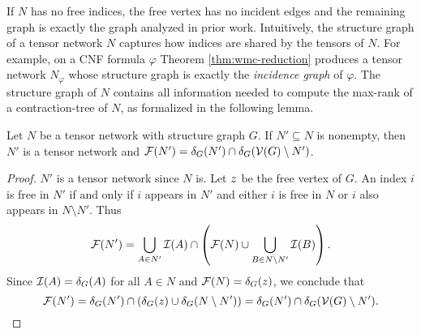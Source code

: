 If $N$ has no free indices, the free vertex has no incident edges and the remaining graph is exactly the graph analyzed in prior work. Intuitively, the structure graph of a tensor network $N$ captures how indices are shared by the tensors of $N$. For example, on a CNF formula $\varphi$ Theorem \ref{thm:wmc-reduction} produces a tensor network $N_\varphi$ whose structure graph is exactly the \emph{incidence graph} of $\varphi$. The structure graph of $N$ contains all information needed to compute the max-rank of a contraction-tree of $N$, as formalized in the following lemma.
\begin{lemma} \label{lemma:tcn-equiv-structure}
	Let $N$ be a tensor network with structure graph $G$. If $N' \subseteq N$ is nonempty, then $N'$ is a tensor network and $\mathcal{F}(N') = \delta_{G}(N') \cap \delta_{G}(\mathcal{V}(G) \setminus N')$.
\end{lemma}
\begin{proof}
	$N'$ is a tensor network since $N$ is. Let $z$ be the free vertex of $G$.
	An index $i$ is free in $N'$ if and only if $i$ appears in $N'$ and either $i$ is free in $N$ or $i$ also appears in $N \setminus N'$. Thus
    $$\mathcal{F}(N') = \bigcup_{A \in N'} \mathcal{I}(A) \cap \left( \mathcal{F}(N) \cup \bigcup_{B \in N \setminus N'} \mathcal{I}(B) \right).$$
	Since $\mathcal{I}(A) = \delta_{G}(A)$ for all $A \in N$ and $\mathcal{F}(N) = \delta_{G}(z)$, we conclude that
	$$\mathcal{F}(N') = \delta_{G}(N') \cap (\delta_{G}(z) \cup \delta_{G}(N \setminus N')) =  \delta_{G}(N') \cap \delta_{G}(\mathcal{V}(G) \setminus N').$$
\end{proof}





